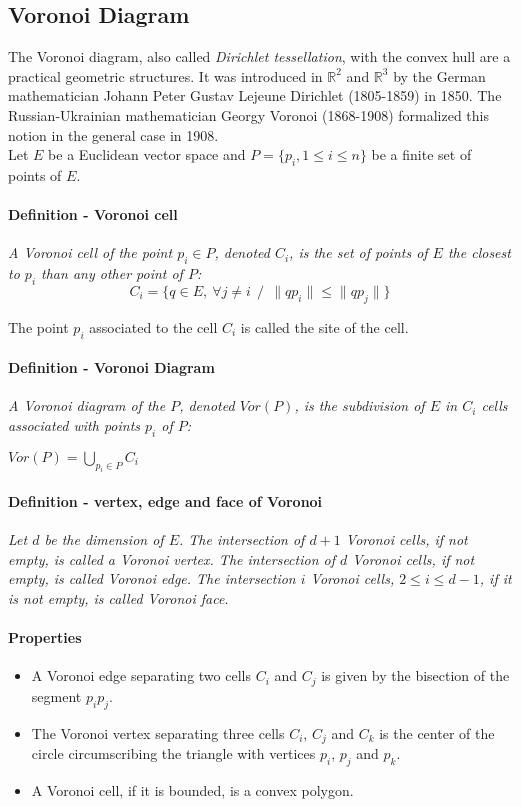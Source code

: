 \subsection{Voronoi Diagram}

The Voronoi diagram, also called {\it Dirichlet tessellation}, with the convex hull are a practical geometric structures. It was introduced in  $\mathbb {R}^{2}$ and $\mathbb{R}^{3}$ by the German mathematician Johann Peter Gustav Lejeune Dirichlet (1805-1859) in 1850. The Russian-Ukrainian mathematician Georgy Voronoi (1868-1908) formalized this notion in the general case in 1908.\\

Let $E$ be a Euclidean vector space and $P = \{p_{i}, 1 \le i \le n\} $ be a finite set of points of $E$.

\paragraph{Definition - Voronoi cell}
{
\it A Voronoi cell of the point $p_{i} \in P$, denoted $C_{i}$, is the set of points of $E$ the closest to $p_ {i}$ than any other point of $P$:
$$
C_{i} = \{q \in E,~\forall j \ne i~~/~~ \| qp_{i} \| \le \| qp_{j} \| \}
$$

The point $p_{i}$ associated to the cell $C_{i}$ is called the site of the cell.
}       

\paragraph{Definition - Voronoi Diagram}
{
\it A Voronoi diagram of the $P$, denoted $Vor (P)$, is the subdivision of $E$ in $C_{i}$ cells associated with points $p_{i}$ of $P$:

$
Vor (P) = \bigcup_{p_{i} \in P} C_{i}
$
}

\paragraph{Definition - vertex, edge and face of Voronoi}
{
\it Let $d$ be the dimension of $E$. The intersection of $d + 1$ Voronoi cells, if not empty, is called a Voronoi vertex. The intersection of $d$ Voronoi cells, if not empty, is called Voronoi edge. The intersection $i$ Voronoi cells, $ 2 \le i \le d - 1$, if it is not empty, is called Voronoi face.
}

\paragraph{Properties}
{
\begin {itemize}
\item A Voronoi edge separating two cells $C_{i}$ and $C_{j}$ is given by the bisection of the segment $p_{i}p_{j}$.
\item The Voronoi vertex separating three cells $C_{i}$, $C_{j}$ and $C_{k}$ is the center of the circle circumscribing the triangle with vertices $p_{i}$, $p_{j}$ and $p_{k}$.
\item A Voronoi cell, if it is bounded, is a convex polygon.
\end {itemize}
}


